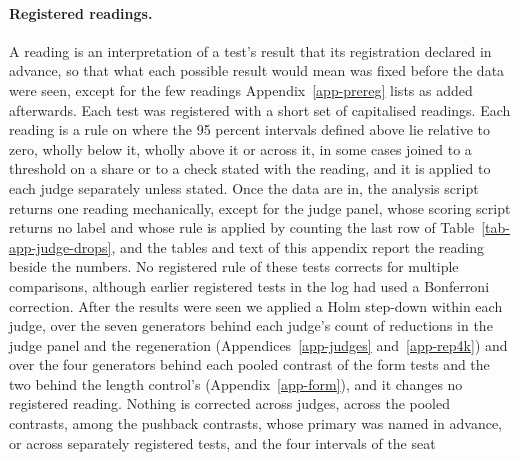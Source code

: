 \paragraph{Registered readings.}
A reading is an interpretation of a test's result that its registration
declared in advance, so that what each possible result would mean was fixed
before the data were seen, except for the few readings
Appendix~\ref{app-prereg} lists as added afterwards.
Each test was registered with a short set of capitalised readings. Each
reading is a rule on where the 95 percent intervals defined above lie relative
to zero, wholly below it, wholly above it or across it, in some cases joined
to a threshold on a share or to a check stated with the reading, and it is
applied to each judge separately unless stated. Once the data are in, the
analysis script returns one reading mechanically, except for the judge panel,
whose scoring script returns no label and whose rule is applied by counting
the last row of Table~\ref{tab-app-judge-drops}, and the tables and text of
this appendix report the reading beside the numbers.
No registered rule of these tests corrects for multiple comparisons, although
earlier registered tests in the log had used a Bonferroni correction. After
the results were seen we applied a Holm step-down within each judge, over the
seven generators behind each judge's count of reductions in the judge panel
and the regeneration (Appendices~\ref{app-judges} and~\ref{app-rep4k}) and
over the four generators behind each pooled contrast of the form tests and
the two behind the length control's (Appendix~\ref{app-form}), and it changes
no registered reading. Nothing is corrected across judges, across the pooled
contrasts, among the pushback contrasts, whose primary was named in advance,
or across separately registered tests, and the four intervals of the seat
